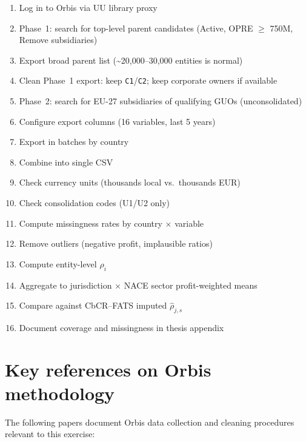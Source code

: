 \documentclass[11pt,a4paper]{article}
\newcommand{\field}[1]{\texttt{#1}}
\begin{document}
\begin{enumerate}[label=$\square$]
  \item Log in to Orbis via UU library proxy
  \item Phase~1: search for top-level parent candidates (Active, OPRE $\geq$ 750M, Remove subsidiaries)
  \item Export broad parent list (\textasciitilde 20,000--30,000 entities is normal)
  \item Clean Phase~1 export: keep \field{C1}/\field{C2}; keep corporate owners if available
  \item Phase~2: search for EU-27 subsidiaries of qualifying GUOs (unconsolidated)
  \item Configure export columns (16 variables, last 5 years)
  \item Export in batches by country
  \item Combine into single CSV
  \item Check currency units (thousands local vs.\ thousands EUR)
  \item Check consolidation codes (U1/U2 only)
  \item Compute missingness rates by country $\times$ variable
  \item Remove outliers (negative profit, implausible ratios)
  \item Compute entity-level $\rho_i$
  \item Aggregate to jurisdiction $\times$ NACE sector profit-weighted means
  \item Compare against CbCR--FATS imputed $\hat{\rho}_{j,s}$
  \item Document coverage and missingness in thesis appendix
\end{enumerate}

\section{Key references on Orbis methodology}\label{sec:references}

The following papers document Orbis data collection and cleaning procedures relevant to this exercise:
\end{document}
